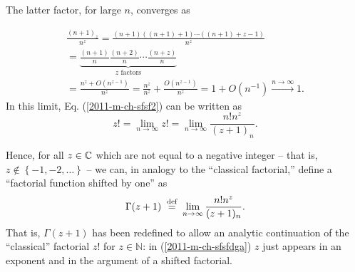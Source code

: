 The latter factor, for large $n$, converges as

\begin{equation}
\begin{split}
\frac{( n +1)_ z  }{  n ^ z }   =
\frac{( n +1)(( n +1)+1)\cdots (( n +1)+ z -1)}{  n ^ z }  \\
=
\underbrace{\frac{( n +1)}{n}
\frac{( n +2)}{n}
\cdots
\frac{( n +z)}{n}}_{z \text{ factors}}
  \\
=
\frac{ n ^ z  +O( n ^{ z -1})}{  n ^ z }
=
\frac{ n ^ z }{  n ^ z }  +
\frac{O( n ^{ z -1})}{ n ^ z }
=
1  + O( n ^{-1})
\stackrel{ n  \rightarrow \infty}{\longrightarrow} 1.
\end{split}
\end{equation}
In this limit, Eq. (\ref{2011-m-ch-sfsf2})  can be written as
\begin{equation}
 z !
= \lim_{ n \rightarrow \infty}  z !
=  \lim_{ n \rightarrow \infty} \frac{ n !  n ^ z  }{  ( z +1)_ n }
.
\label{2011-m-ch-sfsf3}
\end{equation}

Hence, for all $z\in {\Bbb C}$ which are not equal to a negative integer
--
that is,  $z \not\in\left\{-1,-2,\ldots\right\}$
--
we can, in analogy to the ``classical factorial,''
define   a ``factorial function shifted by one'' as
\begin{equation}
\Gamma ( z + 1)
\stackrel{{\tiny \textrm{ def }}}{=} \lim_{ n \rightarrow \infty} \frac{ n !  n ^ z  }{  ( z +1)_ n }.
\label{2011-m-ch-sfsfdga}
\end{equation}
That is,
$\Gamma (z+1)$ has been redefined to
allow  an analytic continuation of the ``classical'' factorial $z!$ for $z \in \mathbb{N}$:
in (\ref{2011-m-ch-sfsfdga}) $z$ just appears in an exponent and in the argument of a shifted factorial.

